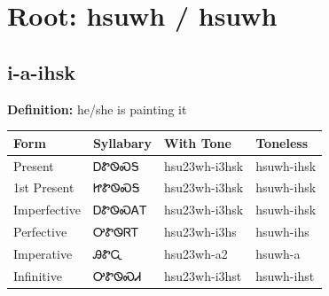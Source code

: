 \documentclass{article}%
\begin{document}
%
\normalsize%
\section*{Root: hsuwh / hsuwh}%
\subsection*{i-a-ihsk}%
\textbf{Definition: }%
he/she is painting it%
\\[0.5em]%
\begin{tabular}{|l|l|l|l|}%
\hline%
\textbf{Form}&\textbf{Syllabary}&\textbf{With Tone}&\textbf{Toneless}\\%
\hline%
Present&ᎠᏑᏫᏍᎦ&hsu23wh{-}i3hsk&hsuwh{-}ihsk\\%
1st Present&ᏥᏑᏫᏍᎦ&hsu23wh{-}i3hsk&hsuwh{-}ihsk\\%
Imperfective&ᎠᏑᏫᏍᎪᎢ&hsu23wh{-}i3hsk&hsuwh{-}ihsk\\%
Perfective&ᎤᏑᏫᏒᎢ&hsu23wh{-}i3hs&hsuwh{-}ihs\\%
Imperative&ᎯᏑᏩ&hsu23wh{-}a2&hsuwh{-}a\\%
Infinitive&ᎤᏑᏫᏍᏗ&hsu23wh{-}i3hst&hsuwh{-}ihst\\%
\hline%
\end{tabular}%
\\[1em]%
\end{document}
